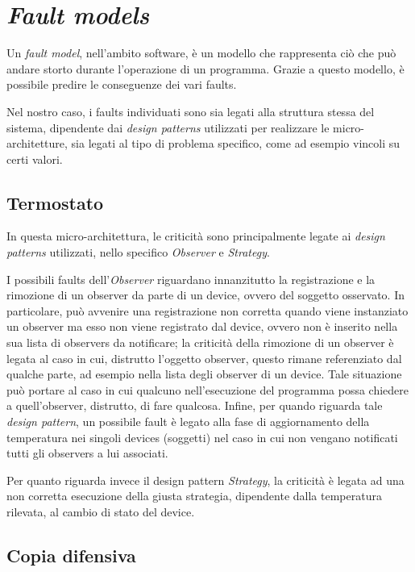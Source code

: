 \chapter{\emph{Fault models}}

Un \emph{fault model}, nell'ambito software, è un modello che rappresenta ciò che può andare storto durante l'operazione di un programma. Grazie a questo modello, è possibile predire le conseguenze dei vari faults.

Nel nostro caso, i faults individuati sono sia legati alla struttura stessa del sistema, dipendente dai \emph{design patterns} utilizzati per realizzare le micro-architetture, sia legati al tipo di problema specifico, come ad esempio vincoli su certi valori.

\section{Termostato}

In questa micro-architettura, le criticità sono principalmente legate ai \emph{design patterns} utilizzati, nello specifico \emph{Observer} e \emph{Strategy}.

I possibili faults dell'\emph{Observer} riguardano innanzitutto la registrazione e la rimozione di un observer da parte di un device, ovvero del soggetto osservato. In particolare, può avvenire una registrazione non corretta quando viene instanziato un observer ma esso non viene registrato dal device, ovvero non è inserito nella sua lista di observers da notificare; la criticità della rimozione di un observer è legata al caso in cui, distrutto l'oggetto observer, questo rimane referenziato dal qualche parte, ad esempio nella lista degli observer di un device. Tale situazione può portare al caso in cui qualcuno nell'esecuzione del programma possa chiedere a quell'observer, distrutto, di fare qualcosa.
Infine, per quando riguarda tale \emph{design pattern}, un possibile fault è legato alla fase di aggiornamento della temperatura nei singoli devices (soggetti) nel caso in cui non vengano notificati tutti gli observers a lui associati.

Per quanto riguarda invece il design pattern \emph{Strategy}, la criticità è legata ad una non corretta esecuzione della giusta strategia, dipendente dalla temperatura rilevata, al cambio di stato del device.


\section{Copia difensiva}

